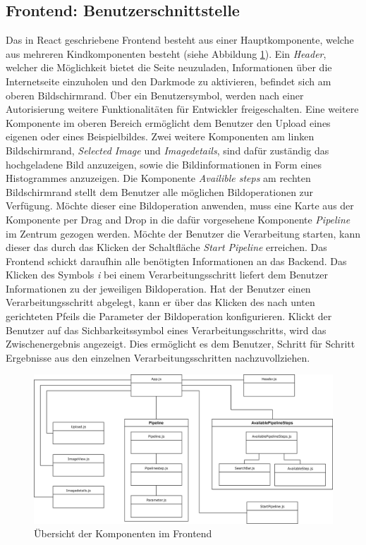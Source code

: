 \subsection{Frontend: Benutzerschnittstelle}
Das in React geschriebene Frontend besteht aus einer Hauptkomponente, welche aus mehreren Kindkomponenten besteht (siehe Abbildung \ref{fig:frontend}).
Ein \textit{Header}, welcher die Möglichkeit bietet die Seite neuzuladen, Informationen über die Internetseite einzuholen und den Darkmode zu aktivieren, befindet sich am oberen Bildschirmrand.
Über ein Benutzersymbol, werden nach einer Autorisierung weitere Funktionalitäten für Entwickler freigeschalten.
Eine weitere Komponente im oberen Bereich ermöglicht dem Benutzer den Upload eines eigenen oder eines Beispielbildes.
Zwei weitere Komponenten am linken Bildschirmrand, \textit{Selected Image} und \textit{Imagedetails}, sind dafür zuständig das hochgeladene Bild anzuzeigen, sowie die Bildinformationen in Form eines Histogrammes anzuzeigen.
Die Komponente \textit{Availible steps} am rechten Bildschirmrand stellt dem Benutzer alle möglichen Bildoperationen zur Verfügung.
Möchte dieser eine Bildoperation anwenden, muss eine Karte aus der Komponente per Drag and Drop in die dafür vorgesehene Komponente \textit{Pipeline} im Zentrum gezogen werden.
Möchte der Benutzer die Verarbeitung starten, kann dieser das durch das Klicken der Schaltfläche \textit{Start Pipeline} erreichen.
Das Frontend schickt daraufhin alle benötigten Informationen an das Backend.
Das Klicken des Symbols \textit{i} bei einem Verarbeitungsschritt liefert dem Benutzer Informationen zu der jeweiligen Bildoperation.
Hat der Benutzer einen Verarbeitungsschritt abgelegt, kann er über das Klicken des nach unten gerichteten Pfeils die Parameter der Bildoperation konfigurieren.
Klickt der Benutzer auf das Sichbarkeitssymbol eines Verarbeitungsschritts, wird das Zwischenergebnis angezeigt.
Dies ermöglicht es dem Benutzer, Schritt für Schritt Ergebnisse aus den einzelnen Verarbeitungsschritten nachzuvollziehen.
\begin{figure}[ht]
    \centering
    \includegraphics[width=\textwidth]{Bilder/FrontendBDCC.drawio.png}
    \caption{Übersicht der Komponenten im Frontend}
    \label{fig:frontend}
\end{figure}